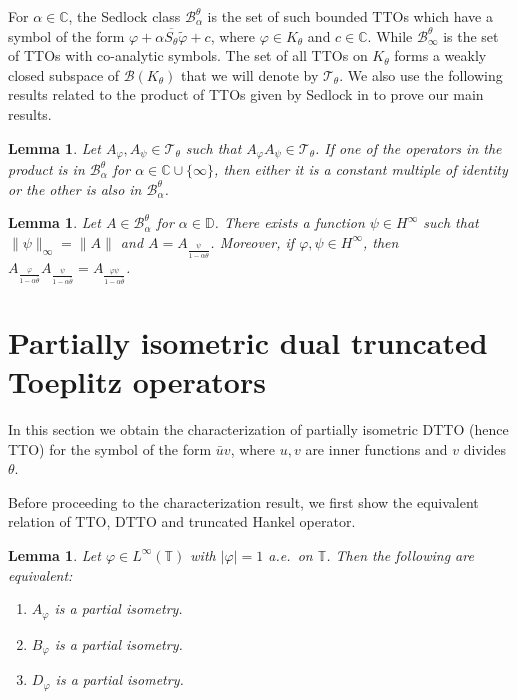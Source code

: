 \documentclass[12pt]{amsart}
\newcommand{\clb}{\mathcal{B}}
\newcommand{\C}{\mathbb{C}}
\newcommand{\D}{\mathbb{D}}
\newcommand{\T}{\mathbb{T}}
\theoremstyle{definition}
\theoremstyle{plain}
\newtheorem{lem}[thm]{Lemma}
\theoremstyle{definition}
\numberwithin{equation}{section}
\let\phi=\varphi
\begin{document}
 

For $\alpha \in \C$, the Sedlock class $\mathscr{B}_{\alpha}^{\theta}$ is the set of such bounded TTOs which have a symbol of the form $\phi +\overline{\alpha S_\theta\tilde{\phi}} +c$, where $ \phi \in K_\theta$ and $c \in \C$. While $\mathscr{B}_\infty^{\theta}$ is the set of TTOs with co-analytic symbols. The set of all TTOs on $K_\theta$ forms a weakly closed subspace of $\clb(K_\theta)$ that we will denote by $\mathscr{T}_\theta$. We also use the following results related to the product of TTOs given by Sedlock in \cite{NS} to prove our main results. 

\begin{lem}\label{prod}
Let $A_\phi, A_\psi \in \mathscr{T}_{\theta}$ such that $A_\phi A_\psi \in \mathscr{T}_{\theta}$. If one of the operators in the product is in $\mathscr{B}_{\alpha}^{\theta}$ for $\alpha \in \C \cup\{\infty\}$, then either it is a constant multiple of identity or the other is also in $\mathscr{B}_{\alpha}^{\theta}$.
\end{lem}

	
\begin{lem}\label{typealphachar}
Let $A \in \mathscr{B}_{\alpha}^\theta$ for $\alpha \in \D$. There exists a function $ \psi \in H^\infty$ such that $\|\psi\|_\infty=\|A\|$ and $A=A_{\frac{\psi}{1-\alpha \bar{\theta}}}$. Moreover, if $\phi, \psi \in H^\infty$, then $A_{\frac{\phi}{1-\alpha \bar{\theta}}}A_{\frac{\psi}{1-\alpha \bar{\theta}}}=A_{\frac{\phi\psi}{1-\alpha \bar{\theta}}}$.
\end{lem}
		

	
	
	
	
\section{Partially isometric dual truncated Toeplitz operators}\label{sec3}

In this section we obtain the characterization of partially isometric DTTO (hence TTO)
for the symbol of the form $\bar{u}v$, where $u, v$ are inner functions and $v$ divides 
$\theta$.




Before proceeding to the characterization result, we first show the equivalent relation of TTO, DTTO and truncated Hankel operator.
	
\begin{lem}\label{Lem:A B and D partial isometry equivalences}
Let $\phi\in L^{\infty}(\T)$ with $|\phi|=1$ a.e.\ on $\T$. Then the following are equivalent:
		\begin{enumerate}
			\item $A_{\phi}$ is a partial isometry.
			\item $B_{\phi}$ is a partial isometry.
			\item $D_{\phi}$ is a partial isometry.
		\end{enumerate}
\end{lem}
	
\end{document}
